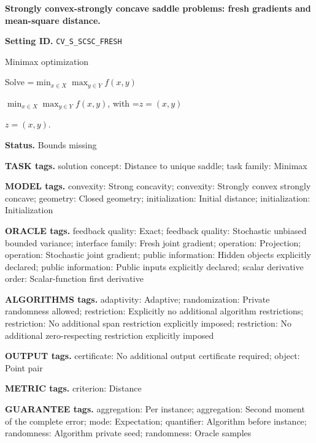 \documentclass[10pt,a4paper]{article}
\newcommand{\AtlasMath}[1]{\par\begingroup\centering\setbox0=\hbox{$\displaystyle #1$}\ifdim\wd0>1.4\linewidth\typeout{ATLAS WIDE FORMULA: \the\wd0}\fi\ifdim\wd0>\linewidth\resizebox{\linewidth}{!}{\box0}\else\box0\fi\par\endgroup}
\newcommand{\AtlasInlineMath}[1]{\begingroup\setbox0=\hbox{$#1$}\ifdim\wd0>.4\linewidth\endgroup\AtlasMath{#1}\else\endgroup$#1$\fi}
\begin{document}
\raggedright

{\LARGE\bfseries\sffamily\color{AtlasNavy} Strongly convex-strongly concave saddle problems: fresh gradients and mean-square distance.\par}\vspace{5pt}


\textbf{Setting ID.} \texttt{CV\_\allowbreak{}S\_\allowbreak{}SCSC\_\allowbreak{}FRESH}



Minimax optimization



Solve \AtlasInlineMath{\min_{x\in X}\max_{y\in Y}f(x,y)}, with \AtlasInlineMath{z=(x,y)}.



\textbf{Status.} Bounds missing



\textbf{TASK tags.} solution concept: Distance to unique saddle; task family: Minimax



\textbf{MODEL tags.} convexity: Strong concavity; convexity: Strongly convex strongly concave; geometry: Closed geometry; initialization: Initial distance; initialization: Initialization



\textbf{ORACLE tags.} feedback quality: Exact; feedback quality: Stochastic unbiased bounded variance; interface family: Fresh joint gradient; operation: Projection; operation: Stochastic joint gradient; public information: Hidden objects explicitly declared; public information: Public inputs explicitly declared; scalar derivative order: Scalar-function first derivative



\textbf{ALGORITHMS tags.} adaptivity: Adaptive; randomization: Private randomness allowed; restriction: Explicitly no additional algorithm restrictions; restriction: No additional span restriction explicitly imposed; restriction: No additional zero-respecting restriction explicitly imposed



\textbf{OUTPUT tags.} certificate: No additional output certificate required; object: Point pair



\textbf{METRIC tags.} criterion: Distance



\textbf{GUARANTEE tags.} aggregation: Per instance; aggregation: Second moment of the complete error; mode: Expectation; quantifier: Algorithm before instance; randomness: Algorithm private seed; randomness: Oracle samples
\end{document}
